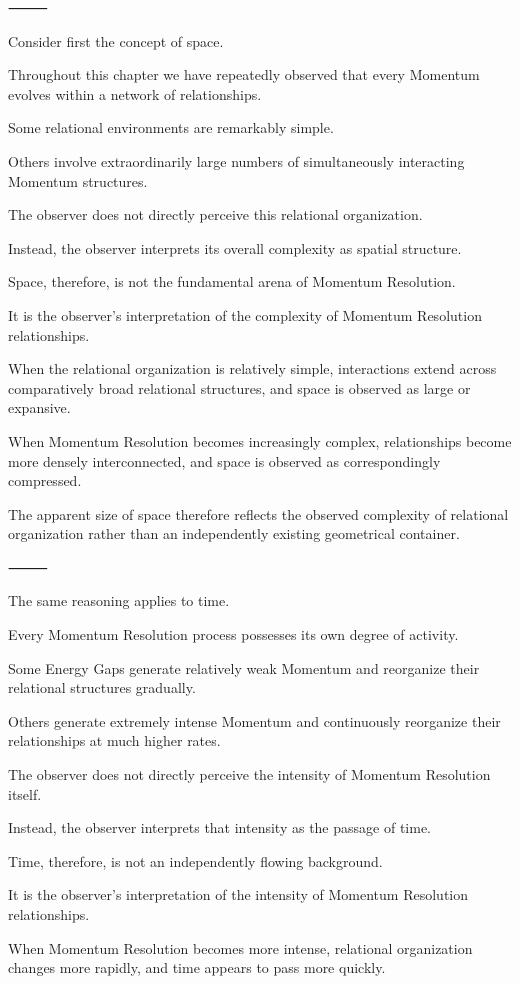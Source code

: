 ⸻

Consider first the concept of space.

Throughout this chapter we have repeatedly observed that every Momentum evolves within a network of relationships.

Some relational environments are remarkably simple.

Others involve extraordinarily large numbers of simultaneously interacting Momentum structures.

The observer does not directly perceive this relational organization.

Instead, the observer interprets its overall complexity as spatial structure.

Space, therefore, is not the fundamental arena of Momentum Resolution.

It is the observer’s interpretation of the complexity of Momentum Resolution relationships.

When the relational organization is relatively simple, interactions extend across comparatively broad relational structures, and space is observed as large or expansive.

When Momentum Resolution becomes increasingly complex, relationships become more densely interconnected, and space is observed as correspondingly compressed.

The apparent size of space therefore reflects the observed complexity of relational organization rather than an independently existing geometrical container.

⸻

The same reasoning applies to time.

Every Momentum Resolution process possesses its own degree of activity.

Some Energy Gaps generate relatively weak Momentum and reorganize their relational structures gradually.

Others generate extremely intense Momentum and continuously reorganize their relationships at much higher rates.

The observer does not directly perceive the intensity of Momentum Resolution itself.

Instead, the observer interprets that intensity as the passage of time.

Time, therefore, is not an independently flowing background.

It is the observer’s interpretation of the intensity of Momentum Resolution relationships.

When Momentum Resolution becomes more intense, relational organization changes more rapidly, and time appears to pass more quickly.

